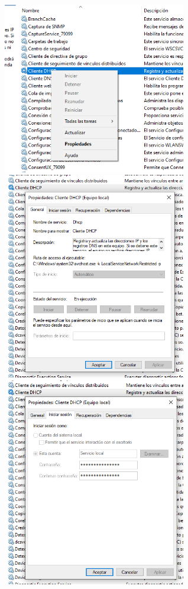 \documentclass[
  a4paper,
]{article}
\begin{document}
\includegraphics[width=0.6\textwidth,height=\textheight]{png/ServiciClientDHCP0.png}
\includegraphics[width=0.6\textwidth,height=\textheight]{png/ServiciClientDHCP1.png}
\includegraphics[width=0.6\textwidth,height=\textheight]{png/ServiciClientDHCP2.png}
\end{document}
